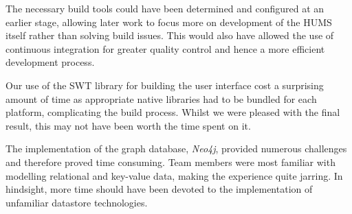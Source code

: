 \documentclass[10pt,a4paper]{article}
\begin{document}
The necessary build tools could have been determined and configured at an earlier stage, allowing later work to focus more on development of the HUMS itself rather than solving build issues. This would also have allowed the use of continuous integration for greater quality control and hence a more efficient development process.

Our use of the SWT library for building the user interface cost a surprising amount of time as appropriate native libraries had to be bundled for each platform, complicating the build process. Whilst we were pleased with the final result, this may not have been worth the time spent on it.

The implementation of the graph database, \emph{Neo4j}, provided numerous challenges and therefore proved time consuming. Team members were most familiar with modelling relational and key-value data, making the experience quite jarring. In hindsight, more time should have been devoted to the implementation of unfamiliar datastore technologies.

\clearpage



\end{document}
